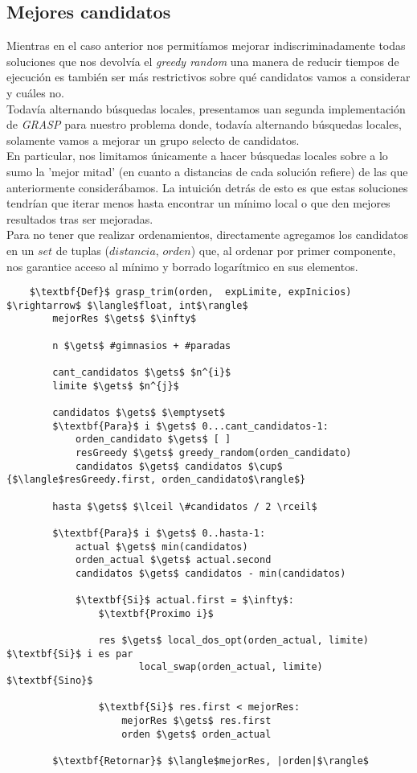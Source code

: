\subsection{Mejores candidatos}
Mientras en el caso anterior nos permitíamos mejorar indiscriminadamente todas soluciones que nos devolvía el \emph{greedy random} una manera de reducir tiempos de ejecución es también ser más restrictivos sobre qué candidatos vamos a considerar y cuáles no.
\\

Todavía alternando búsquedas locales, presentamos uan segunda implementación de \emph{GRASP} para nuestro problema donde, todavía alternando búsquedas locales, solamente vamos a mejorar un grupo selecto de candidatos.
\\

En particular, nos limitamos únicamente a hacer búsquedas locales sobre a lo sumo la 'mejor mitad' (en cuanto a distancias de cada solución refiere) de las que anteriormente considerábamos. La intuición detrás de esto es que estas soluciones tendrían que iterar menos hasta encontrar un mínimo local o que den mejores resultados tras ser mejoradas.
\\

Para no tener que realizar ordenamientos, directamente agregamos los candidatos en un $set$ de tuplas ($distancia$, $orden$) que, al ordenar por primer componente, nos garantice acceso al mínimo y borrado logarítmico en sus elementos.

\begin{lstlisting}
    $\textbf{Def}$ grasp_trim(orden,  expLimite, expInicios) $\rightarrow$ $\langle$float, int$\rangle$
        mejorRes $\gets$ $\infty$

        n $\gets$ #gimnasios + #paradas

        cant_candidatos $\gets$ $n^{i}$
        limite $\gets$ $n^{j}$

        candidatos $\gets$ $\emptyset$
        $\textbf{Para}$ i $\gets$ 0...cant_candidatos-1:
            orden_candidato $\gets$ [ ]
            resGreedy $\gets$ greedy_random(orden_candidato)
            candidatos $\gets$ candidatos $\cup$ {$\langle$resGreedy.first, orden_candidato$\rangle$}

        hasta $\gets$ $\lceil \#candidatos / 2 \rceil$

        $\textbf{Para}$ i $\gets$ 0..hasta-1:
            actual $\gets$ min(candidatos)
            orden_actual $\gets$ actual.second
            candidatos $\gets$ candidatos - min(candidatos)

            $\textbf{Si}$ actual.first = $\infty$:
                $\textbf{Proximo i}$

                res $\gets$ local_dos_opt(orden_actual, limite) $\textbf{Si}$ i es par
                       local_swap(orden_actual, limite) $\textbf{Sino}$

                $\textbf{Si}$ res.first < mejorRes:
                    mejorRes $\gets$ res.first
                    orden $\gets$ orden_actual

        $\textbf{Retornar}$ $\langle$mejorRes, |orden|$\rangle$
\end{lstlisting}

